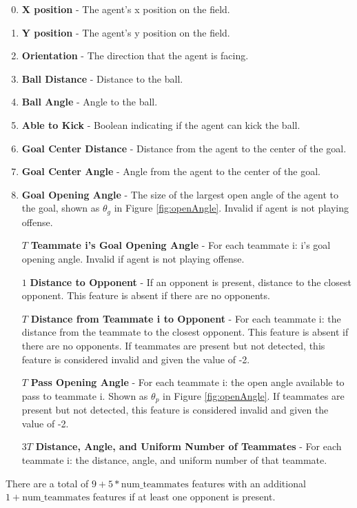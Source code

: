 \documentclass[12pt]{article}
\begin{document}
\begin{enumerate}
\setcounter{enumi}{-1}
\item{\textbf{X position} - The agent’s x position on the field.}
\item{\textbf{Y position} - The agent’s y position on the field.}
\item{\textbf{Orientation} - The direction that the agent is facing.}
\item{\textbf{Ball Distance} - Distance to the ball.}
\item{\textbf{Ball Angle} - Angle to the ball.}
\item{\textbf{Able to Kick} - Boolean indicating if the agent can kick the ball.}
\item{\textbf{Goal Center Distance} - Distance from the agent to the center of the goal.}
\item{\textbf{Goal Center Angle} - Angle from the agent to the center of the goal.}
\item{\textbf{Goal Opening Angle} - The size of the largest open angle
  of the agent to the goal, shown as $\theta_g$ in Figure
  \ref{fig:openAngle}. Invalid if agent is not playing offense.}
\item [$T$] {\textbf{Teammate i's Goal Opening Angle} - For each
  teammate i: i’s goal opening angle. Invalid if agent is not playing
  offense.}
\item [$1$] {\textbf{Distance to Opponent} - If an opponent is present,
  distance to the closest opponent. This feature is absent if there
  are no opponents.}
\item [$T$] {\textbf{Distance from Teammate i to Opponent} - For each
  teammate i: the distance from the teammate to the closest
  opponent. This feature is absent if there are no opponents. If
  teammates are present but not detected, this feature is considered
  invalid and given the value of -2.}
\item [$T$] {\textbf{Pass Opening Angle} - For each teammate i: the open
  angle available to pass to teammate i. Shown as $\theta_p$ in Figure
  \ref{fig:openAngle}. If teammates are present but not detected, this
  feature is considered invalid and given the value of -2.}
\item [$3T$] {\textbf{Distance, Angle, and Uniform Number of
    Teammates} - For each teammate i: the distance, angle, and uniform
  number of that teammate.}
\end{enumerate}

There are a total of $9 + 5*\textrm{num\_teammates}$ features with an
additional $1 + \textrm{num\_teammates}$ features if at least one
opponent is present.
\end{document}
